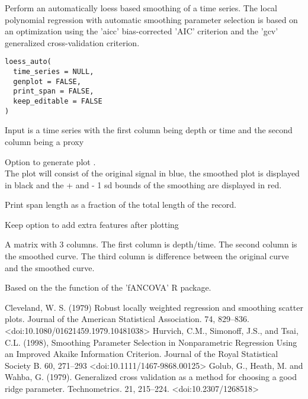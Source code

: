 \documentclass[a4paper]{book}
\begin{document}
%
\begin{Description}
Perform an automatically loess based smoothing of a time series.
The local polynomial regression with automatic smoothing parameter selection is based on an
optimization using the 'aicc' bias-corrected 'AIC' criterion and the 'gcv' generalized cross-validation criterion.
\end{Description}
%
\begin{Usage}
\begin{verbatim}
loess_auto(
  time_series = NULL,
  genplot = FALSE,
  print_span = FALSE,
  keep_editable = FALSE
)
\end{verbatim}
\end{Usage}
%
\begin{Arguments}
\begin{ldescription}
\item[\code{time\_series}] Input is a time series with the first column being depth or time and the second column being a proxy

\item[\code{genplot}] Option to generate plot . \\{}
The plot will consist of the original signal in blue, the smoothed plot is displayed
in black and the + and - 1 sd bounds of the smoothing are displayed in red.

\item[\code{print\_span}] Print span length as a fraction of the total length of the record.

\item[\code{keep\_editable}] Keep option to add extra features after plotting  
\end{ldescription}
\end{Arguments}
%
\begin{Value}
A matrix with 3 columns.
The first column is depth/time.
The second column is the smoothed curve.
The third column is difference between the original curve and the smoothed curve.
\end{Value}
%
\begin{Author}
Based on the the  function of the 'fANCOVA' R package.
\end{Author}
%
\begin{References}
Cleveland, W. S. (1979) Robust locally weighted regression and smoothing scatter plots. Journal of the American Statistical Association. 74, 829–836. <doi:10.1080/01621459.1979.10481038>
Hurvich, C.M., Simonoff, J.S., and Tsai, C.L. (1998), Smoothing Parameter Selection in Nonparametric Regression Using an Improved Akaike Information Criterion. Journal of the Royal Statistical Society B. 60, 271–293 <doi:10.1111/1467-9868.00125>
Golub, G., Heath, M. and Wahba, G. (1979). Generalized cross validation as a method for choosing a good ridge parameter. Technometrics. 21, 215–224. <doi:10.2307/1268518>
\end{References}
\end{document}
